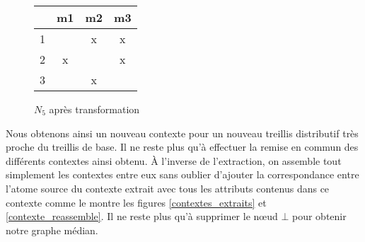 \begin{figure}[H]
	\begin{minipage}[c]{0.5\textwidth}
	\begin{center}
		\begin{tabular}{ l | c c c }
			 & m1 & m2 & m3 \\
			\hline
			1 & & x & x \\
			2 & x & & x\\
			3 & & x & \\
		\end{tabular}
	\end{center}
	\end{minipage}
	\begin{minipage}[c]{0.5\textwidth}
	\begin{center}
	\end{center}
	\end{minipage}
	\caption{$N_5$ après transformation}
\end{figure}

Nous obtenons ainsi un nouveau contexte pour un nouveau treillis distributif très proche du treillis de base. Il ne reste plus qu'à effectuer la remise en commun des différents contextes ainsi obtenu. À l'inverse de l'extraction, on assemble tout simplement les contextes entre eux sans oublier d'ajouter la correspondance entre l'atome source du contexte extrait avec tous les attributs contenus dans ce contexte comme le montre les figures \ref{contextes_extraits} et \ref{contexte_reassemble}. Il ne reste plus qu'à supprimer le n\oe ud $\bot$ pour obtenir notre graphe médian.

